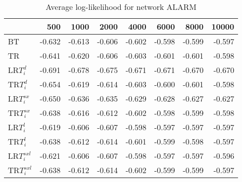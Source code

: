 
\begin{table}
 \begin{center}
 \begin{tabular}{lrrrrrrr}
 & 500 & 1000 & 2000 & 4000 & 6000 & 8000 & 10000\\\hline
BT & -0.632 & -0.613 & -0.606 & -0.602 & -0.598 & -0.599 & -0.597\\\hline
TR & -0.641 & -0.620 & -0.606 & -0.603 & -0.601 & -0.601 & -0.598\\\hline
LR$T_i^d$ & -0.691 & -0.678 & -0.675 & -0.671 & -0.671 & -0.670 & -0.670\\\hline
TR$T_i^d$ & -0.654 & -0.619 & -0.614 & -0.603 & -0.600 & -0.601 & -0.598\\\hline
LR$T_i^{sx}$ & -0.650 & -0.636 & -0.635 & -0.629 & -0.628 & -0.627 & -0.627\\\hline
TR$T_i^{sx}$ & -0.638 & -0.616 & -0.612 & -0.602 & -0.598 & -0.599 & -0.598\\\hline
LR$T_i^l$ & -0.619 & -0.606 & -0.607 & -0.598 & -0.597 & -0.597 & -0.597\\\hline
TR$T_i^l$ & -0.638 & -0.612 & -0.614 & -0.601 & -0.599 & -0.598 & -0.597\\\hline
LR$T_i^{sxl}$ & -0.621 & -0.606 & -0.607 & -0.598 & -0.597 & -0.597 & -0.596\\\hline
TR$T_i^{sxl}$ & -0.638 & -0.612 & -0.614 & -0.602 & -0.599 & -0.599 & -0.597\\\hline
\end{tabular}
\end{center}
\caption{Average log-likelihood for network ALARM }
\label{Alarmll}
\end{table}


